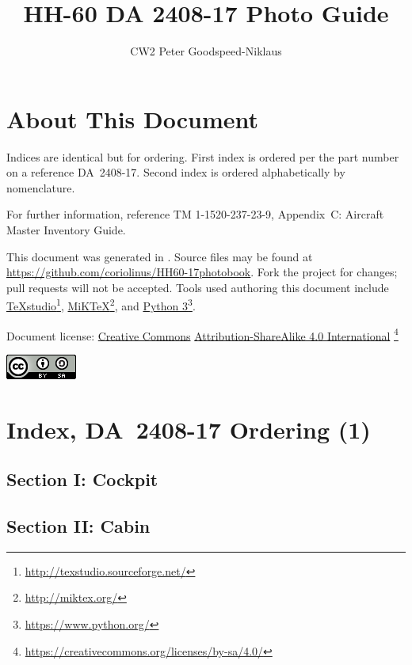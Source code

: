 \documentclass[letterpaper,11pt,openany,oneside]{book}
\author{CW2 Peter Goodspeed-Niklaus}
\title{HH-60 DA 2408-17 Photo Guide}
\begin{document}
\frontmatter
\setcounter{page}{0}
\maketitle
\clearpage
\captionsetup{labelformat=empty}
\chapter*{About This Document}
Indices are identical but for ordering. First index is ordered per the part number on a reference DA~2408-17. Second index is ordered alphabetically by nomenclature.

For further information, reference TM 1-1520-237-23-9, Appendix~C: Aircraft Master Inventory Guide.

This document was generated in \LaTeXe. Source files may be found at \url{https://github.com/coriolinus/HH60-17photobook}. Fork the project for changes; pull requests will not be accepted. Tools used authoring this document include \href{http://texstudio.sourceforge.net/}{TeXstudio}\footnote{\url{http://texstudio.sourceforge.net/}}, \href{http://miktex.org/}{MiKTeX}\footnote{\url{http://miktex.org/}}, and \href{https://www.python.org/}{Python 3}\footnote{\url{https://www.python.org/}}.

Document license: \href{https://creativecommons.org/}{Creative Commons} \href{https://creativecommons.org/licenses/by-sa/4.0/}{Attribution-ShareAlike 4.0 International}
\footnote{\url{https://creativecommons.org/licenses/by-sa/4.0/}}

\begin{center}
	\href{https://creativecommons.org/licenses/by-sa/4.0/}{\includegraphics{Images/cc-by-sa.png}}
\end{center}

\mainmatter
\chapter{Index, DA~2408-17 Ordering (1)}
\section{Section I: Cockpit}

\clearpage
\section{Section II: Cabin}

\clearpage
\end{document}
